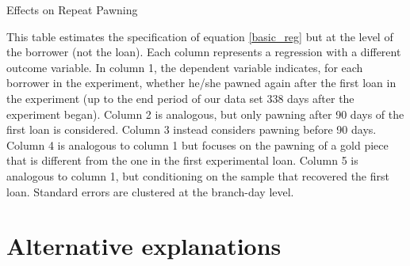 \begin{appendix}
\begin{table}[!h]
\caption{Effects on Repeat Pawning}
\label{repeat_loans}
\begin{center}
\footnotesize{}
\end{center}
 \footnotesize{This table estimates the specification of equation \ref{basic_reg} but at the level of the borrower (not the loan). Each column represents a regression with a different outcome variable. In column 1, the dependent variable indicates, for each borrower in the experiment, whether he/she pawned again after the first loan in the experiment (up to the end period of our data set 338 days after the experiment began). Column 2 is analogous, but only pawning after 90 days of the first loan is considered. Column 3 instead considers pawning before 90 days. Column 4 is analogous to column 1 but focuses on the pawning of a gold piece that is different from the one in the first experimental loan. Column 5 is analogous to column 1, but conditioning on the sample that recovered the first loan. 
Standard errors are clustered at the branch-day level.}
\end{table}




\newpage


\section{ Alternative explanations}

\end{appendix}
